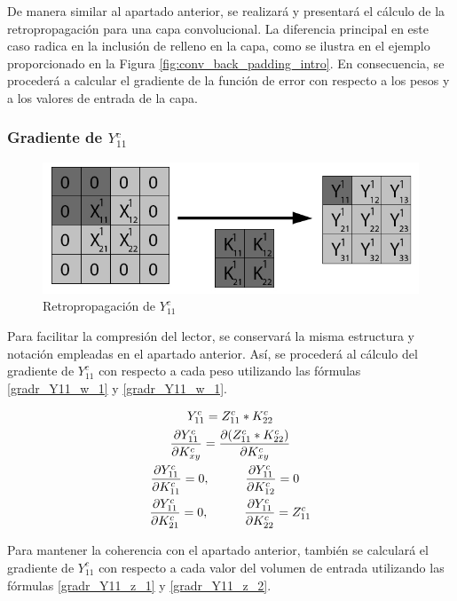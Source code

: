 De manera similar al apartado anterior, se realizará y presentará el cálculo de la retropropagación para una capa convolucional. La diferencia principal en este caso radica en la inclusión de relleno en la capa, como se ilustra en el ejemplo proporcionado en la Figura \ref{fig:conv_back_padding_intro}. En consecuencia, se procederá a calcular el gradiente de la función de error con respecto a los pesos y a los valores de entrada de la capa.

\subsubsection{Gradiente de $Y^c_{11}$}

\begin{figure}[H]
	\centering
	\includegraphics[width=0.8\linewidth]{imagenes/conv_back_padding_1.jpg} 
	\caption{Retropropagación de $Y^c_{11}$}
\end{figure}

Para facilitar la compresión del lector, se conservará la misma estructura y notación empleadas en el apartado anterior. Así, se procederá al cálculo del gradiente de $Y^c_{11}$ con respecto a cada peso utilizando las fórmulas \ref{gradr_Y11_w_1} y \ref{gradr_Y11_w_1}.

\begin{gather}
	Y^c_{11} = Z^c_{11} * K^c_{22} \\
	\frac{\partial Y^c_{11}}{\partial K^c_{xy}} = \frac{\partial (Z^c_{11} * K^c_{22})}{\partial K^c_{xy}} \\
	\frac{\partial Y^c_{11}}{\partial K^c_{11}} = 0, \hspace{10mm} \frac{\partial Y^c_{11}}{\partial K^c_{12}} = 0 \hspace{3mm} \label{gradr_Y11_w_1} \\
	\frac{\partial Y^c_{11}}{\partial K^c_{21}} = 0, \hspace{10mm} \frac{\partial Y^c_{11}}{\partial K^c_{22}} = Z^c_{11} \label{gradr_Y11_w_2}
\end{gather}

Para mantener la coherencia con el apartado anterior, también se calculará el gradiente de $Y^c_{11}$ con respecto a cada valor del volumen de entrada utilizando las fórmulas \ref{gradr_Y11_z_1} y \ref{gradr_Y11_z_2}.


